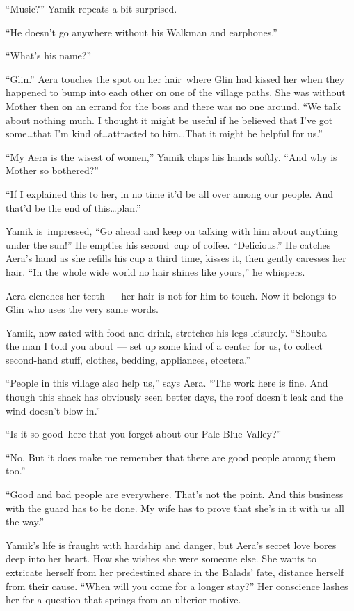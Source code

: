 \documentclass[twoside,11pt,openany]{book}
\begin{document}
{}``Music?'' Yamik repeats a bit surprised.

``He doesn't go anywhere without his Walkman and earphones.''

{}``What's his name?''

{}``Glin.'' Aera touches the spot on her hair~where Glin had kissed her when they happened to bump into each other on
one of the village paths. She was without Mother then on an errand for the boss and there was no one around. ``We talk
about nothing much. I thought it might be useful if he believed that I've got some{\ldots}that I'm kind of{\ldots}attracted to him{\ldots}That it might be helpful for us.''

{}``My Aera is the wisest of women,'' Yamik claps his hands softly. ``And why is Mother so bothered?''

``If I explained this to her, in no time it'd be all over among our people. And that'd be the end of this{\ldots}plan.''

Yamik is~impressed, ``Go ahead and keep on talking with him about anything under the sun!'' He empties his second~cup of
coffee. ``Delicious.'' He catches Aera's hand as she refills his cup a third time, kisses it, then gently caresses
her hair. {}``In the whole wide world no hair shines like yours,{}'' he whispers.

Aera clenches her teeth --- her hair is not for him to touch. Now it belongs to Glin who uses the very same words.

Yamik, now sated with food and drink, stretches his legs leisurely. ``Shouba --- the man I told you about --- set up some
kind of a center for us, to collect second-hand stuff, clothes, bedding, appliances, etcetera.''

{}``People in this village also help us,'' says Aera. ``The work here is fine. And though this shack has obviously seen
better days, the roof doesn't leak and the wind doesn't blow in.''

{}``Is it so good~here that you forget about our Pale Blue Valley?''

{}``No. But it does make me remember that there are good people among them too.''

{}``Good and bad people are everywhere. That's not the point. And this business with the guard has to be done. My wife
has to prove that she's in it with us all the way.''

Yamik's life is fraught with hardship and danger, but Aera's secret love bores deep into her heart. How she wishes she
were someone else. She wants to extricate herself from her predestined share in the Balads{'} fate, distance herself from
their cause. ``When will you come for a longer stay?'' Her conscience lashes her for a question that springs from an
ulterior motive.
\end{document}
